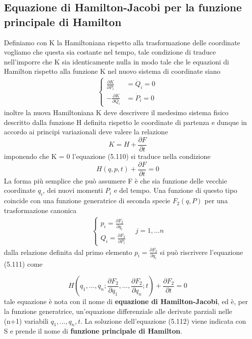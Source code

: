 \subsection{Equazione di Hamilton-Jacobi per la funzione principale di Hamilton}

Definiamo con K la Hamiltoniana rispetto alla trasformazione delle coordinate vogliamo che questa sia costante nel tempo, tale condizione di traduce nell'imporre che K sia identicamente nulla in modo tale che le equazioni di Hamilton rispetto alla funzione K nel nuovo sistema di coordinate siano
\begin{align}
	\begin{cases}
\frac{\partial K}{\partial P_i} & =\dot{Q}_i=0 \\
-\frac{\partial K}{\partial Q_i} & =\dot{P}_i=0
\end{cases}
\end{align}
inoltre la nuova Hamiltoniana K deve descrivere il medesimo sistema fisico descritto dalla funzione H definita rispetto le coordinate di partenza e dunque in accordo ai principi variazionali deve valere la relazione 
\begin{equation}
	K = H + \frac{\partial F}{\partial t}
\end{equation}
imponendo che K = 0 l'equazione (5.110) si traduce nella condizione 
\begin{equation}
	H(q,p,t) + \frac{\partial F}{\partial t} = 0
\end{equation}
La forma pi\`{u} semplice che pu\`{o} assumere F \`{e} che sia funzione delle vecchie coordinate $q_i$, dei nuovi momenti $P_i$ e del tempo. Una funzione di questo tipo coincide con una funzione generatrice di seconda specie $F_2(q,P)$ per una trasformazione canonica 
\begin{align*}
	\begin{cases}
		p_i = \frac{\partial F_2}{\partial q_i}\\
		Q_i = \frac{\partial F_2}{\partial P_i}
	\end{cases}
	\quad j = 1,...n
\end{align*}
dalla relazione definita dal primo elemento $p_i = \frac{\partial F_2}{\partial q_i}$ si pu\`{o} riscrivere l'equazione (5.111) come

\begin{equation}
	H\left(q_1, \ldots, q_n ; \frac{\partial F_2}{\partial q_1}, \ldots, \frac{\partial F_2}{\partial q_n} ; t\right)+\frac{\partial F_2}{\partial t}=0
\end{equation}
\newline
tale equazione \`{e} nota con il nome di \textbf{equazione di Hamilton-Jacobi}, ed \`{e}, per la funzione generatrice, un'equazione differenziale alle derivate parziali nelle (n+1) variabili $q_1,...,q_n,t$. La soluzione dell'equazione (5.112) viene indicata con S e prende il nome di \textbf{funzione principale di Hamilton}.\newline

